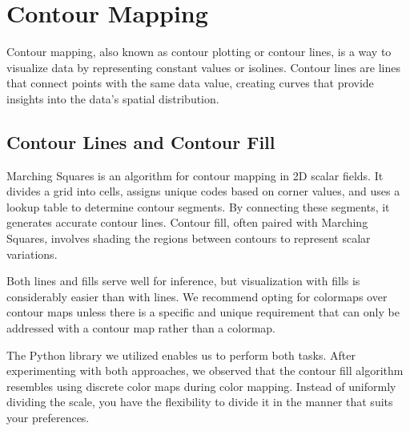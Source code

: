 \documentclass[conference]{IEEEtran}
\begin{document}
\section{Contour Mapping}

Contour mapping, also known as contour plotting or contour lines, is a way to visualize data by representing constant values or isolines. Contour lines are lines that connect points with the same data value, creating curves that provide insights into the data's spatial distribution.

\subsection{Contour Lines and Contour Fill}
Marching Squares is an algorithm for contour mapping in 2D scalar fields. It divides a grid into cells, assigns unique codes based on corner values, and uses a lookup table to determine contour segments. By connecting these segments, it generates accurate contour lines. Contour fill, often paired with Marching Squares, involves shading the regions between contours to represent scalar variations. 


Both lines and fills serve well for inference, but visualization with fills is considerably easier than with lines. We recommend opting for colormaps over contour maps unless there is a specific and unique requirement that can only be addressed with a contour map rather than a colormap.

The Python library we utilized enables us to perform both tasks. After experimenting with both approaches, we observed that the contour fill algorithm resembles using discrete color maps during color mapping. Instead of uniformly dividing the scale, you have the flexibility to divide it in the manner that suits your preferences.
\end{document}
